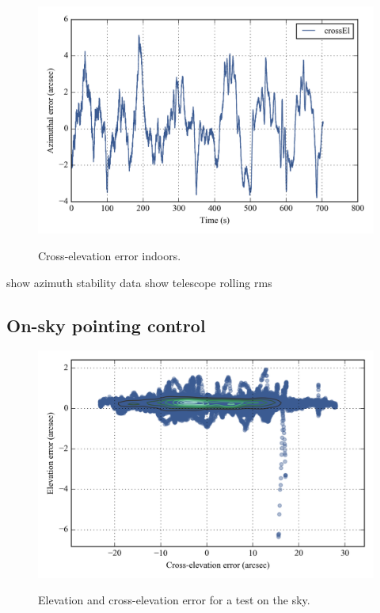 \begin{figure}[!h]
\begin{center}
\includegraphics{Figures/simplePlot_crossEl.png}
\label{fig:simplePlot_crossEl}
\vspace{-0.5cm}
\caption[Cross-elevation error indoors]{Cross-elevation error indoors.}
\end{center}
\end{figure}



 show azimuth stability data
show telescope rolling rms
\subsection{On-sky pointing control}

\begin{figure}[!h]
\begin{center}
\includegraphics{Figures/simple2DPlot_crossEl_elevation.png}
\label{fig:simple2DPlot_crossEl_elevation}
\vspace{-0.5cm}
\caption[Elevation and cross-elevation error]{Elevation and cross-elevation error  for a test on the sky.}
\end{center}
\end{figure}

